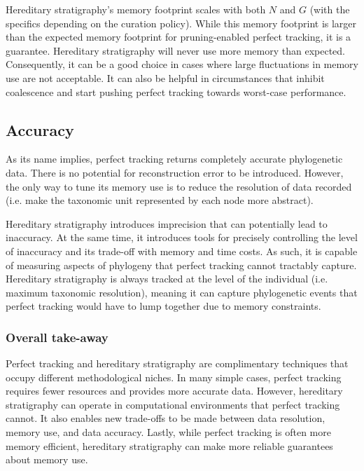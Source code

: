 Hereditary stratigraphy's memory footprint scales with both $N$ and $G$ (with the specifics depending on the curation policy).
While this memory footprint is larger than the expected memory footprint for pruning-enabled perfect tracking, it is a guarantee. 
Hereditary stratigraphy will never use more memory than expected.
Consequently, it can be a good choice in cases where large fluctuations in memory use are not acceptable.
It can also be helpful in circumstances that inhibit coalescence and start pushing perfect tracking towards worst-case performance.

\subsection{Accuracy}

As its name implies, perfect tracking returns completely accurate phylogenetic data. 
There is no potential for reconstruction error to be introduced.
However, the only way to tune its memory use is to reduce the resolution of data recorded (i.e. make the taxonomic unit represented by each node more abstract).

Hereditary stratigraphy introduces imprecision that can potentially lead to inaccuracy.
At the same time, it introduces tools for precisely controlling the level of inaccuracy and its trade-off with memory and time costs.
As such, it is capable of measuring aspects of phylogeny that perfect tracking cannot tractably capture. 
Hereditary stratigraphy is always tracked at the level of the individual (i.e. maximum taxonomic resolution), meaning it can capture phylogenetic events that perfect tracking would have to lump together due to memory constraints.


\subsubsection{Overall take-away}

Perfect tracking and hereditary stratigraphy are complimentary techniques that occupy different methodological niches.
In many simple cases, perfect tracking requires fewer resources and provides more accurate data.
However, hereditary stratigraphy can operate in computational environments that perfect tracking cannot.
It also enables new trade-offs to be made between data resolution, memory use, and data accuracy.
Lastly, while perfect tracking is often more memory efficient, hereditary stratigraphy can make more reliable guarantees about memory use.

